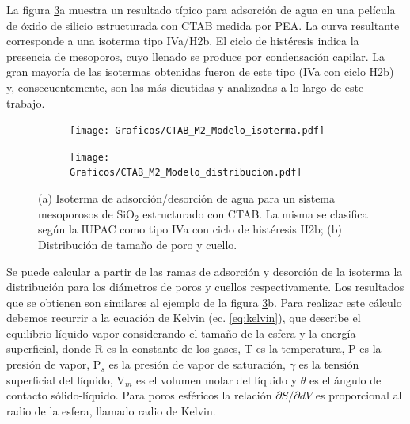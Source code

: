 		La figura \ref{fig:pea_ej}a muestra un resultado típico para adsorción de agua en una película de óxido de silicio estructurada con CTAB medida por PEA. La curva resultante corresponde a una isoterma tipo IVa/H2b. El ciclo de histéresis indica la presencia de mesoporos, cuyo llenado se produce por condensación capilar. \cite{Gregg1967}La gran mayoría de las isotermas obtenidas fueron de este tipo (IVa con ciclo H2b) y, consecuentemente, son las más dicutidas y analizadas a lo largo de este trabajo. 

			\begin{figure}[!ht]
		     	  		\begin{subfigure}[t]{0.491\textwidth}
		     	  		\texttt{[image: Graficos/CTAB\_M2\_Modelo\_isoterma.pdf]}
						\label{fig:pea_ej1}
						\end{subfigure}
						\begin{subfigure}[t]{0.495\textwidth}
		     	  		\texttt{[image: Graficos/CTAB\_M2\_Modelo\_distribucion.pdf]}
						\label{fig:pea_ej2}
						\end{subfigure}
						\vspace*{-0.6cm}
						\caption[Isoterma de adsorción/desorción tipo IVa, H2b.]{(a) Isoterma de adsorción/desorción de agua para un sistema mesoporosos de SiO$_2$ estructurado con CTAB. La misma se clasifica según la IUPAC como tipo IVa con ciclo de histéresis H2b; (b) Distribución de tamaño de poro y cuello.}
						\label{fig:pea_ej}
						\end{figure}			
		\vspace{0.3cm}				
		Se puede calcular a partir de las ramas de adsorción y desorción de la isoterma la distribución para los diámetros de poros y cuellos respectivamente. Los resultados que se obtienen son similares al ejemplo de la figura \ref{fig:pea_ej}b. Para realizar este cálculo debemos recurrir a la ecuación de Kelvin (ec. \ref{eq:kelvin}), que describe el equilibrio líquido-vapor considerando el tamaño de la esfera y la energía superficial, donde R es la constante de los gases, T es la temperatura, P es la presión de vapor, P$_s$ es la presión de vapor de saturación, $\gamma$ es la tensión superficial del líquido, V$_m$ es el volumen molar del líquido y $\theta$ es el ángulo de contacto sólido-líquido. \cite{Baklanov2000,Boissiere2005,Sing1985} Para poros esféricos la relación $\partial S/ \partial dV$ es proporcional al radio de la esfera, llamado radio de Kelvin.\cite{FernandezPrini2005}
		
